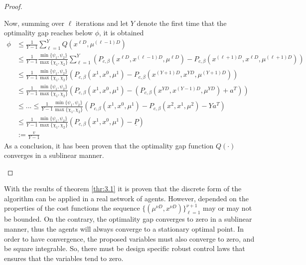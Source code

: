 \begin{proof}
\begin{enumerate}
\begin{equation*}
            \end{equation*}
            Now, summing over $\ell$ iterations and let $Y$ denote the first time that the optimality gap reaches below $\phi$, it is obtained
            \begin{equation*}
                \begin{align}
                    \phi &\leq \frac{1}{Y - 1} \sum_{\ell = 1}^{Y} Q(x^{\ell D}, \mu^{(\ell - 1)D})\\
                    &\leq \frac{1}{Y - 1}\frac{\min\{\psi_1,\psi_2\}}{\max\{\chi_1,\chi_2\}}\sum_{\ell = 1}^{Y}\left(P_{c,\beta} (x^{\ell D}, x^{(\ell - 1)D}, \mu^{\ell D}) - P_{c,\beta}(x^{(\ell + 1)D}, x^{\ell D}, \mu^{(\ell + 1)D})\right)\\
                    & \leq  \frac{1}{Y - 1}\frac{\min\{\psi_1,\psi_2\}}{\max\{\chi_1,\chi_2\}} \left(P_{c,\beta} (x^1, x^0, \mu^1) - P_{c,\beta}(x^{(Y + 1)D}, x^{Y D}, \mu^{(Y + 1)D})\right)\\
                    & \leq \frac{1}{Y - 1}\frac{\min\{\psi_1,\psi_2\}}{\max\{\chi_1,\chi_2\}} \left(P_{c,\beta} (x^1, x^0, \mu^1) - (P_{c,\beta}(x^{Y D}, x^{(Y - 1)D}, \mu^{Y D}) + a^T)\right)\\
                    & \leq...\leq \frac{1}{Y - 1}\frac{\min\{\psi_1,\psi_2\}}{\max\{\chi_1,\chi_2\}} \left(P_{c,\beta} (x^1, x^0, \mu^1) - P_{c,\beta}(x^2, x^1, \mu^2) - Ya^T\right)\\
                    & \leq \frac{1}{Y - 1}\frac{\min\{\psi_1,\psi_2\}}{\max\{\chi_1,\chi_2\}} \left(P_{c,\beta} (x^1, x^0, \mu^1) - \underline{P}\right)\\
                    &:=\frac{v}{Y - 1}
                \end{align}
            \end{equation*}
            As a conclusion, it has been proven that the optimality gap function $Q(\cdot)$ converges in a sublinear manner.
        \end{enumerate}
    \end{proof}

    With the results of theorem \ref{thr:3.1} it is proven that the discrete form of the algorithm can be applied in a real network of agents. However, depended on the properties of the cost functions the sequence $\{(\mu^{\nu D}, x^{\nu D})\}_{\ell = 1}^{\nu + 1}$ may or may not be bounded. On the contrary, the optimality gap converges to zero in a sublinear manner, thus the agents will always converge to a stationary optimal point. In order to have convergence, the proposed variables must also converge to zero, and be square integrable. So, there must be design specific robust control laws that ensures that the variables tend to zero. 